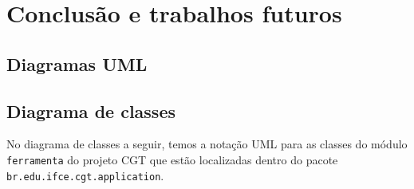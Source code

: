 \documentclass[12pt,twoside,openright,a4paper,english,brazil,sumario=tradicional]{abntex2}
\begin{document}
\chapter{Conclusão e trabalhos futuros}
\label{chap:conclcsao}

\postextual


\begin{apendicesenv}
   \partapendices
   \chapter{Diagramas UML}
   \label{chap:diagramas}

   \section{Diagrama de classes}
   No diagrama de classes a seguir, temos a notação UML para as classes do módulo \texttt{ferramenta} do projeto CGT que estão localizadas dentro do pacote \texttt{br.edu.ifce.cgt.application}.


\end{apendicesenv}
\end{document}
